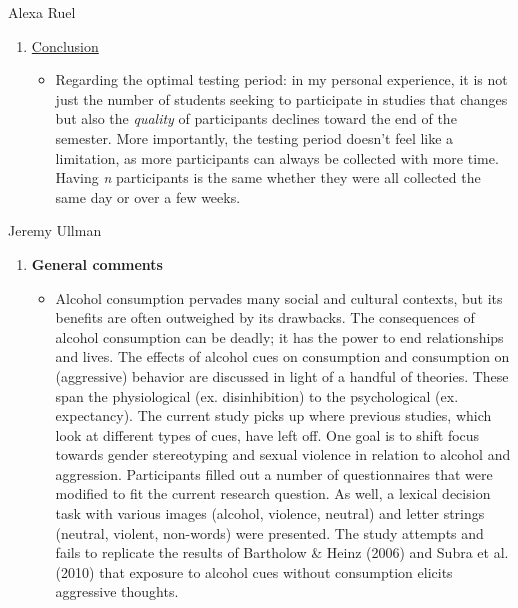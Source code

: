 \documentclass[authordate, serif, review]{jote-article}
\begin{document}
\begin{multicols}{2}
\begin{reviewend}{ Alexa Ruel}
\begin{enumerate}[label=\textbf{\arabic*}), start=0]
    \item \hyperref[sec:conclusion]{Conclusion}
        \begin{itemize}
            \item  Regarding the optimal testing period: in my personal experience, it is not just the number of students seeking to participate in studies that changes but also the \textit{quality} of participants declines toward the end of the semester. More importantly, the testing period doesn't feel like a limitation, as more participants can always be collected with more time. Having \textit{n} participants is the same whether they were all collected the same day or over a few weeks.
        \end{itemize}
    \end{enumerate}
    
\end{reviewend}

\newpage

\begin{reviewend}{ Jeremy Ullman}
    \begin{enumerate}[label=\textbf{\arabic*}), start=0]
        \item \textbf{General comments}
            \begin{itemize}
                \item Alcohol consumption pervades many social and cultural contexts, but its benefits are often outweighed by its drawbacks. The consequences of alcohol consumption can be deadly; it has the power to end relationships and lives. The effects of alcohol cues on consumption and consumption on (aggressive) behavior are discussed in light of a handful of theories. These span the physiological (ex. disinhibition) to the psychological (ex. expectancy). The current study picks up where previous studies, which look at different types of cues, have left off. One goal is to shift focus towards gender stereotyping and sexual violence in relation to alcohol and aggression. Participants filled out a number of questionnaires that were modified to fit the current research question. As well, a lexical decision task with various images (alcohol, violence, neutral) and letter strings (neutral, violent, non-words) were presented. The study attempts and fails to replicate the results of Bartholow \& Heinz (2006) and Subra et al. (2010) that exposure to alcohol cues without consumption elicits aggressive thoughts.
            \end{itemize}
            

\end{enumerate}
\end{reviewend}
\end{multicols}
\end{document}
